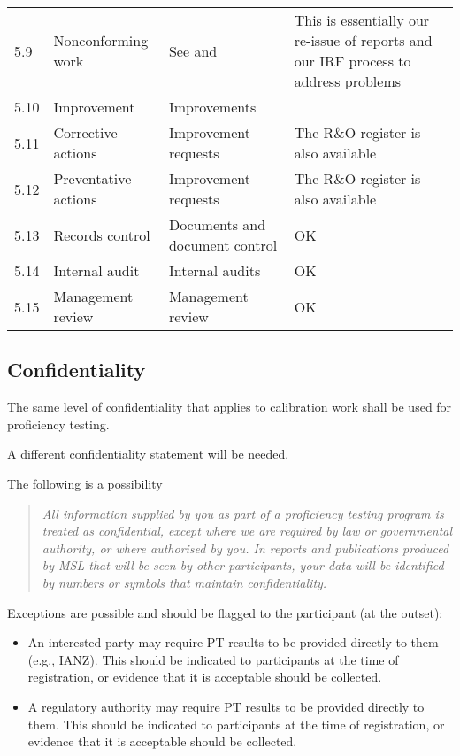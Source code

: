 \begin{center}
{\begin{longtable}{p{1em}p{10em}p{12em}p{16em}}
5.9	& Nonconforming work	& See \cite[\S\ref*{QM-ss:metrological_reports}]{MSL_Quality_Manual} and \cite[\S\ref*{QM-ss:improvement_requests}]{MSL_Quality_Manual} &
This is essentially our re-issue of reports and our IRF process to address problems \\
5.10	& Improvement	& Improvements  \cite[\S\ref*{QM-s:improvements}]{MSL_Quality_Manual}  \\
5.11	&Corrective actions	& Improvement requests  \cite[\S\ref*{QM-ss:improvement_requests}]{MSL_Quality_Manual} & The R\&O register is also available \\
5.12	& Preventative actions	& Improvement requests  \cite[\S\ref*{QM-ss:improvement_requests}]{MSL_Quality_Manual} & The R\&O register is also available \\
5.13	& Records control	& Documents and document control \cite[\S\ref*{QM-s:documents_and_document_control}]{MSL_Quality_Manual} & OK\\
5.14	& Internal audit	& Internal audits \cite[\S\ref*{QM-ss:internal_audit}]{MSL_Quality_Manual} & OK \\
5.15	& Management review	& Management review \cite[\S\ref*{QM-ss:management_review}]{MSL_Quality_Manual} & OK \\	
\end{longtable} } 
\end{center}

\subsection{Confidentiality}
 \label{ss:confidentiality}
The same level of confidentiality that applies to calibration work shall be used for proficiency testing. 

A different confidentiality statement will be needed. 

The following is a possibility
\begin{quote}
\it
All information supplied by you as part of a proficiency testing program is treated as confidential, except where we are required by law or governmental authority, or where authorised by you. In reports and publications produced by MSL that will be seen by other participants, your data will be identified by numbers or symbols that maintain confidentiality.
\end{quote}

Exceptions are possible and should be flagged to the participant (at the outset):
\begin{itemize}
\item	An interested party may require PT results to be provided directly to them (e.g., IANZ). This should be indicated to participants at the time of registration, or evidence that it is acceptable should be collected.
\item	A regulatory authority may require PT results to be provided directly to them. This should be indicated to participants at the time of registration, or evidence that it is acceptable should be collected.

\end{itemize}

